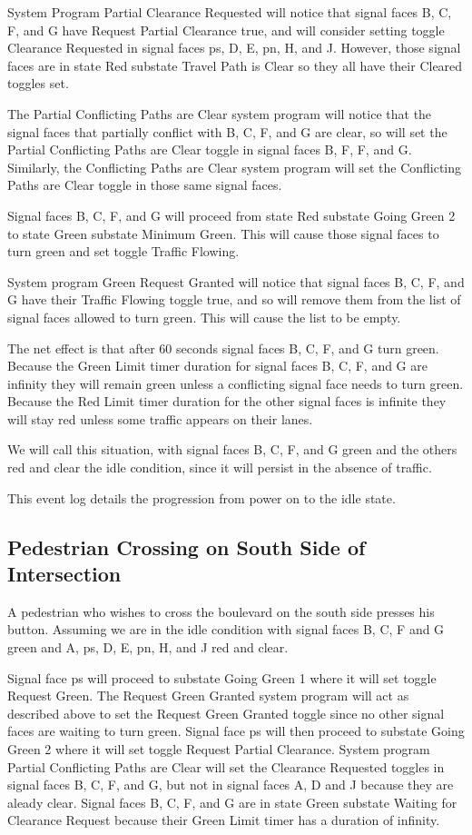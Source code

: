 \documentclass[letterpaper,twoside]{article}
\begin{document}
System Program Partial Clearance Requested will notice that signal faces
B, C, F, and G have Request Partial Clearance true,
and will consider setting toggle Clearance
Requested in signal faces ps, D, E, pn, H, and J.  However, those signal faces
are in state Red substate Travel Path is Clear so they all have their
Cleared toggles set.

The Partial Conflicting Paths are Clear system program will notice that the
signal faces that partially conflict with B, C, F, and G are clear,
so will set the
Partial Conflicting Paths are Clear toggle in signal faces B, F, F, and G.
Similarly, the Conflicting Paths are Clear system program will set
the Conflicting Paths are Clear toggle in those same signal faces.

Signal faces B, C, F, and G will proceed from state Red substate
Going Green 2 to state Green substate Minimum Green.
This will cause those signal faces to turn green and set toggle
Traffic Flowing.

System program Green Request Granted will notice that signal faces
B, C, F, and G have their Traffic Flowing toggle true,
and so will remove them from the list of signal faces allowed to turn green.
This will cause the list to be empty.

The net effect is that after 60 seconds signal faces
B, C, F, and G turn green.  Because the Green Limit timer duration for signal
faces B, C, F, and G are infinity they will remain green unless
a conflicting signal face needs to turn green.  Because the Red Limit
timer duration for the other signal faces is infinite they will stay red
unless some traffic appears on their lanes.

We will call this situation, with signal faces B, C, F, and G green
and the others red and clear the idle condition, since it will persist
in the absence of traffic.

This event log details the progression from power on to the idle state.



\subsection{Pedestrian Crossing on South Side of Intersection}
A pedestrian who wishes to cross the boulevard on the south side
presses his button.  Assuming we are in the idle condition
with signal faces
B, C, F and G green and A, ps, D, E, pn, H, and J red and clear.

Signal face ps will proceed to substate Going Green 1 where it will set
toggle Request Green.  The Request Green Granted system program will act
as described above to set the Request Green Granted toggle since no other
signal faces are waiting to turn green.  Signal face ps will then
proceed to substate Going Green 2 where it will set toggle Request Partial
Clearance.  System program Partial Conflicting Paths are Clear will set
the Clearance Requested toggles in signal faces B, C, F, and G,
but not in signal faces A, D and J because they are aleady clear.
Signal faces B, C, F, and G are in state Green substate Waiting for Clearance
Request because their Green Limit timer has a duration of infinity.
\end{document}
